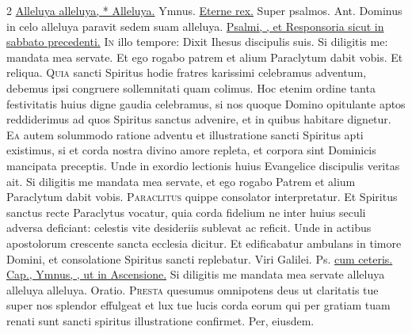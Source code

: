 \begin{multicols*}{2}
{\color{Red} }
 \hyperlink{alleluya-invitatorium}{Alleluya alleluya, * Alleluya.} {\color{Red} Ymnus.} \hyperlink{eterne-rex-altissime}{Eterne rex.} {\color{Red} Super psalmos. Ant.} Dominus in celo alleluya paravit sedem suam alleluya. \ul{Psalmi, \Vbar , et Responsoria sicut in sabbato precedenti.}
\lettrine[lines=2]{\zallmancaps \color{Red} I}{n} illo tempore: Dixit Ihesus discipulis suis. Si diligitis me: mandata mea servate. Et ego rogabo patrem et alium Paraclytum dabit vobis. Et reliqua.
\lettrine[lines=2]{\zallmancaps \color{Blue} Q}{uia} sancti Spiritus hodie fratres karissimi celebramus adventum, debemus ipsi congruere sollemnitati quam colimus. Hoc etenim ordine tanta festivitatis huius digne gaudia celebramus, si nos quoque Domino opitulante aptos reddiderimus ad quos Spiritus sanctus advenire, et in quibus habitare dignetur.
\lettrine[lines=2]{\zallmancaps \color{Red} E}{a} autem solummodo ratione adventu et illustratione sancti Spiritus apti existimus, si et corda nostra divino amore repleta, et corpora sint Dominicis mancipata preceptis. Unde in exordio lectionis huius Evangelice discipulis veritas ait. Si diligitis me mandata mea servate, et ego rogabo Patrem et alium Paraclytum dabit vobis.
\lettrine[lines=2]{\zallmancaps \color{Blue} P}{araclitus} quippe consolator interpretatur. Et Spiritus sanctus recte Paraclytus vocatur, quia corda fidelium ne inter huius seculi adversa deficiant: celestis vite desideriis sublevat ac reficit. Unde in actibus apostolorum crescente sancta ecclesia dicitur. Et edificabatur ambulans in timore Domini, et consolatione Spiritus sancti replebatur.
 Viri Galilei. {\color{Red} Ps.}  \ul{cum ceteris. Cap., Ymnus, \Vbar , ut in Ascensione.}
 Si diligitis me mandata mea servate alleluya alleluya alleluya. {\color{Red} Oratio.}
\lettrine[lines=2]{\zallmancaps \color{Red} P}{resta} \hypertarget{presta-quesumus-pentecostes}{\label{presta-quesumus-pentecostes}} quesumus omnipotens deus ut claritatis tue super nos splendor effulgeat et lux tue lucis corda eorum qui per gratiam tuam renati sunt sancti spiritus illustratione confirmet. Per, eiusdem.

\end{multicols*}
